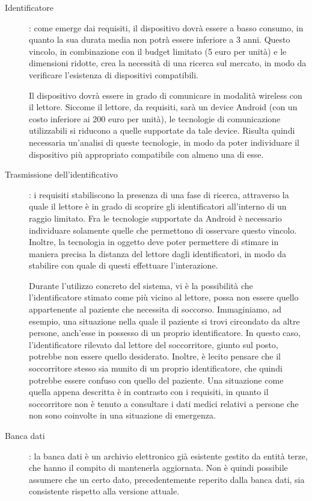 \documentclass[a4paper,12pt]{report}
\begin{document}
\begin{description}
	\item[Identificatore]: come emerge dai requisiti, il dispositivo dovrà essere a basso consumo, in quanto la sua durata media non potrà essere inferiore a 3 anni. Questo vincolo, in combinazione con il budget limitato (5 euro per unità) e le dimensioni ridotte, crea la necessità di una ricerca sul mercato, in modo da verificare l'esistenza di dispositivi compatibili.
	
	Il dispositivo dovrà essere in grado di comunicare in modalità wireless con il lettore. Siccome il lettore, da requisiti, sarà un device Android (con un costo inferiore ai 200 euro per unità), le tecnologie di comunicazione utilizzabili si riducono a quelle supportate da tale device. Risulta quindi necessaria un'analisi di queste tecnologie, in modo da poter individuare il dispositivo più appropriato compatibile con almeno una di esse. 
	
	\item[Trasmissione dell'identificativo]: i requisiti stabiliscono la presenza di una fase di ricerca, attraverso la quale il lettore è in grado di scoprire gli identificatori all'interno di un raggio limitato. Fra le tecnologie supportate da Android è necessario individuare solamente quelle che permettono di osservare questo vincolo. Inoltre, la tecnologia in oggetto deve poter permettere di stimare in maniera precisa la distanza del lettore dagli identificatori, in modo da stabilire con quale di questi effettuare l'interazione.
	
	Durante l'utilizzo concreto del sistema, vi è la possibilità che l'identificatore stimato come più vicino al lettore, possa non essere quello appartenente al paziente che necessita di soccorso. Immaginiamo, ad esempio, una situazione nella quale il paziente si trovi circondato da altre persone, anch'esse in possesso di un proprio identificatore. In questo caso, l'identificatore rilevato dal lettore del soccorritore, giunto sul posto, potrebbe non essere quello desiderato. Inoltre, è lecito pensare che il soccorritore stesso sia munito di un proprio identificatore, che quindi potrebbe essere confuso con quello del paziente. Una situazione come quella appena descritta è in contrasto con i requisiti, in quanto il soccorritore non è tenuto a consultare i dati medici relativi a persone che non sono coinvolte in una situazione di emergenza. 
	
	\item[Banca dati]: la banca dati è un archivio elettronico già esistente gestito da entità terze, che hanno il compito di mantenerla aggiornata. Non è quindi possibile assumere che un certo dato, precedentemente reperito dalla banca dati, sia consistente rispetto alla versione attuale. 
	

\end{description}
\end{document}
